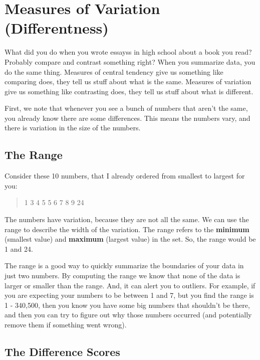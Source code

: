 \documentclass[
]{book}
\begin{document}
\hypertarget{measures-of-variation-differentness}{%
\section{Measures of Variation (Differentness)}\label{measures-of-variation-differentness}}

What did you do when you wrote essayss in high school about a book you read? Probably compare and contrast something right? When you summarize data, you do the same thing. Measures of central tendency give us something like comparing does, they tell us stuff about what is the same. Measures of variation give us something like contrasting does, they tell us stuff about what is different.

First, we note that whenever you see a bunch of numbers that aren't the same, you already know there are some differences. This means the numbers vary, and there is variation in the size of the numbers.

\hypertarget{the-range}{%
\subsection{The Range}\label{the-range}}

Consider these 10 numbers, that I already ordered from smallest to largest for you:

\begin{quote}
1 3 4 5 5 6 7 8 9 24
\end{quote}

The numbers have variation, because they are not all the same. We can use the range to describe the width of the variation. The range refers to the \textbf{minimum} (smallest value) and \textbf{maximum} (largest value) in the set. So, the range would be 1 and 24.

The range is a good way to quickly summarize the boundaries of your data in just two numbers. By computing the range we know that none of the data is larger or smaller than the range. And, it can alert you to outliers. For example, if you are expecting your numbers to be between 1 and 7, but you find the range is 1 - 340,500, then you know you have some big numbers that shouldn't be there, and then you can try to figure out why those numbers occurred (and potentially remove them if something went wrong).

\hypertarget{the-difference-scores}{%
\subsection{The Difference Scores}\label{the-difference-scores}}
\end{document}
